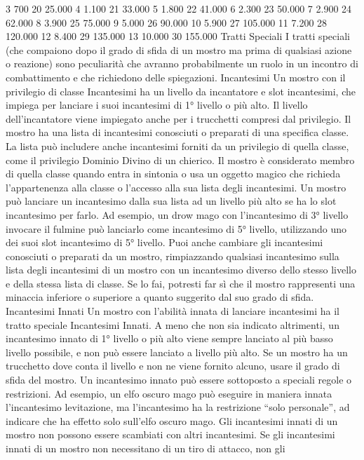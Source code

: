 \begin{multicols}{2}
3 700 20 25.000
4 1.100 21 33.000
5 1.800 22 41.000
6 2.300 23 50.000
7 2.900 24 62.000
8 3.900 25 75.000
9 5.000 26 90.000
10 5.900 27 105.000
11 7.200 28 120.000
12 8.400 29 135.000
13 10.000 30 155.000
Tratti Speciali
I tratti speciali (che compaiono dopo il grado di sfida di un
mostro ma prima di qualsiasi azione o reazione) sono
peculiarità che avranno probabilmente un ruolo in un
incontro di combattimento e che richiedono delle
spiegazioni.
Incantesimi
Un mostro con il privilegio di classe Incantesimi ha un
livello da incantatore e slot incantesimi, che impiega per
lanciare i suoi incantesimi di 1° livello o più alto. Il livello
dell’incantatore viene impiegato anche per i trucchetti
compresi dal privilegio.
Il mostro ha una lista di incantesimi conosciuti o preparati di
una specifica classe. La lista può includere anche incantesimi
forniti da un privilegio di quella classe, come il privilegio
Dominio Divino di un chierico. Il mostro è considerato
membro di quella classe quando entra in sintonia o usa un
oggetto magico che richieda l’appartenenza alla classe o
l’accesso alla sua lista degli incantesimi.
Un mostro può lanciare un incantesimo dalla sua lista ad un
livello più alto se ha lo slot incantesimo per farlo. Ad
esempio, un drow mago con l’incantesimo di 3° livello
invocare il fulmine può lanciarlo come incantesimo di 5°
livello, utilizzando uno dei suoi slot incantesimo di 5° livello.
Puoi anche cambiare gli incantesimi conosciuti o
preparati da un mostro, rimpiazzando qualsiasi
incantesimo sulla lista degli incantesimi di un mostro
con un incantesimo diverso dello stesso livello e della
stessa lista di classe. Se lo fai, potresti far sì che il
mostro rappresenti una minaccia inferiore o superiore a
quanto suggerito dal suo grado di sfida.
Incantesimi Innati
Un mostro con l’abilità innata di lanciare incantesimi ha il
tratto speciale Incantesimi Innati. A meno che non sia
indicato altrimenti, un incantesimo innato di 1° livello o più
alto viene sempre lanciato al più basso livello possibile, e
non può essere lanciato a livello più alto. Se un mostro ha
un trucchetto dove conta il livello e non ne viene fornito
alcuno, usare il grado di sfida del mostro.
Un incantesimo innato può essere sottoposto a speciali
regole o restrizioni. Ad esempio, un elfo oscuro mago può
eseguire in maniera innata l’incantesimo levitazione, ma
l’incantesimo ha la restrizione “solo personale”, ad indicare
che ha effetto solo sull’elfo oscuro mago.
Gli incantesimi innati di un mostro non possono essere
scambiati con altri incantesimi. Se gli incantesimi innati di
un mostro non necessitano di un tiro di attacco, non gli

\end{multicols}
